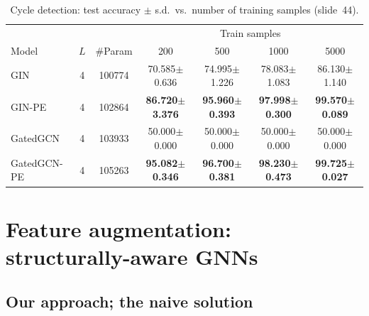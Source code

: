 \begin{table}[htbp]
  \centering\footnotesize
  \caption{Cycle detection: test accuracy $\pm$ s.d.\ vs.\ number of training
  samples (slide~44).}
  \label{tab:lec07-pe}
  \setlength{\tabcolsep}{4pt}
  \begin{tabular}{@{}lcc|cccc@{}}
    \toprule
    & & & \multicolumn{4}{c}{Train samples}\\
    Model & $L$ & \#Param & 200 & 500 & 1000 & 5000\\
    \midrule
    GIN & 4 & 100774 & 70.585$\pm$0.636 & 74.995$\pm$1.226 & 78.083$\pm$1.083
      & 86.130$\pm$1.140\\
    GIN-PE & 4 & 102864 & \textbf{86.720$\pm$3.376} & \textbf{95.960$\pm$0.393}
      & \textbf{97.998$\pm$0.300} & \textbf{99.570$\pm$0.089}\\
    \midrule
    GatedGCN & 4 & 103933 & 50.000$\pm$0.000 & 50.000$\pm$0.000 & 50.000$\pm$0.000
      & 50.000$\pm$0.000\\
    GatedGCN-PE & 4 & 105263 & \textbf{95.082$\pm$0.346} & \textbf{96.700$\pm$0.381}
      & \textbf{98.230$\pm$0.473} & \textbf{99.725$\pm$0.027}\\
    \bottomrule
  \end{tabular}
\end{table}

\section{Feature augmentation: structurally-aware GNNs}\label{sec:lec07-struct}

\subsection{Our approach; the naive solution}\label{sec:lec07-naive}

